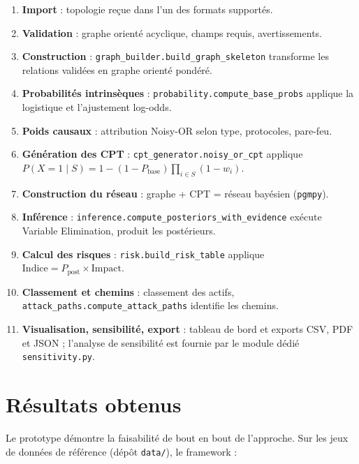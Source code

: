 \documentclass[12pt,a4paper]{article}
\newcommand{\forcereset}[1]{}
\begin{document}
\begin{enumerate}[itemsep=0.08\baselineskip, topsep=0.25\baselineskip]
    \item \textbf{Import} : topologie reçue dans l'un des formats supportés.
    \item \textbf{Validation} : graphe orienté acyclique, champs requis, avertissements.
    \item \textbf{Construction} : \texttt{graph\_builder.build\_graph\_skeleton} transforme les relations validées en graphe orienté pondéré.
    \item \textbf{Probabilités intrinsèques} : \texttt{probability.compute\_base\_probs} applique la logistique et l'ajustement log-odds.
    \item \textbf{Poids causaux} : attribution Noisy-OR selon type, protocoles, pare-feu.
    \item \textbf{Génération des CPT} : \texttt{cpt\_generator.noisy\_or\_cpt} applique $P(X{=}1 \mid S) = 1-(1-P_{\text{base}})\prod_{i \in S}(1-w_i)$.
    \item \textbf{Construction du réseau} : graphe + CPT = réseau bayésien (\texttt{pgmpy}).
    \item \textbf{Inférence} : \texttt{inference.compute\_posteriors\_with\_evidence} exécute Variable Elimination, produit les postérieurs.
    \item \textbf{Calcul des risques} : \texttt{risk.build\_risk\_table} applique $\text{Indice} = P_{\text{post}} \times \text{Impact}$.
    \item \textbf{Classement et chemins} : classement des actifs, \texttt{attack\_paths.compute\_attack\_paths} identifie les chemins.
    \item \textbf{Visualisation, sensibilité, export} : tableau de bord et exports CSV, PDF et JSON ; l'analyse de sensibilité est fournie par le module dédié \texttt{sensitivity.py}.
\end{enumerate}

\section{Résultats obtenus}
\forcereset{6}

Le prototype démontre la faisabilité de bout en bout de l'approche. Sur les jeux de données de référence (dépôt \texttt{data/}), le framework :
\end{document}
